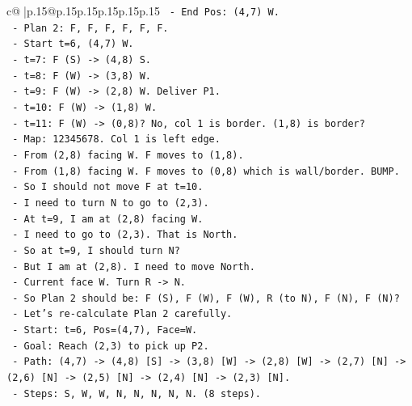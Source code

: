 \documentclass{article}
\begin{document}
{\begin{supertabular}{c@{$\;$}|p{.15\linewidth}@{}p{.15\linewidth}p{.15\linewidth}p{.15\linewidth}p{.15\linewidth}p{.15\linewidth}}
{{{\texttt{            {-} End Pos: (4,7) W.} \\
\texttt{          {-} Plan 2: F, F, F, F, F, F.} \\
\texttt{            {-} Start t=6, (4,7) W.} \\
\texttt{            {-} t=7: F (S) {-}> (4,8) S.} \\
\texttt{            {-} t=8: F (W) {-}> (3,8) W.} \\
\texttt{            {-} t=9: F (W) {-}> (2,8) W. Deliver P1.} \\
\texttt{            {-} t=10: F (W) {-}> (1,8) W.} \\
\texttt{            {-} t=11: F (W) {-}> (0,8)? No, col 1 is border. (1,8) is border?} \\
\texttt{              {-} Map: 12345678. Col 1 is left edge.} \\
\texttt{              {-} From (2,8) facing W. F moves to (1,8).} \\
\texttt{              {-} From (1,8) facing W. F moves to (0,8) which is wall/border. BUMP.} \\
\texttt{              {-} So I should not move F at t=10.} \\
\texttt{              {-} I need to turn N to go to (2,3).} \\
\texttt{              {-} At t=9, I am at (2,8) facing W.} \\
\texttt{              {-} I need to go to (2,3). That is North.} \\
\texttt{              {-} So at t=9, I should turn N?} \\
\texttt{              {-} But I am at (2,8). I need to move North.} \\
\texttt{              {-} Current face W. Turn R {-}> N.} \\
\texttt{              {-} So Plan 2 should be: F (S), F (W), F (W), R (to N), F (N), F (N)?} \\
\texttt{              {-} Let's re{-}calculate Plan 2 carefully.} \\
\texttt{              {-} Start: t=6, Pos=(4,7), Face=W.} \\
\texttt{              {-} Goal: Reach (2,3) to pick up P2.} \\
\texttt{              {-} Path: (4,7) {-}> (4,8) {[}S{]} {-}> (3,8) {[}W{]} {-}> (2,8) {[}W{]} {-}> (2,7) {[}N{]} {-}> (2,6) {[}N{]} {-}> (2,5) {[}N{]} {-}> (2,4) {[}N{]} {-}> (2,3) {[}N{]}.} \\
\texttt{              {-} Steps: S, W, W, N, N, N, N, N. (8 steps).} \\
}}}
\end{supertabular}}
\end{document}
